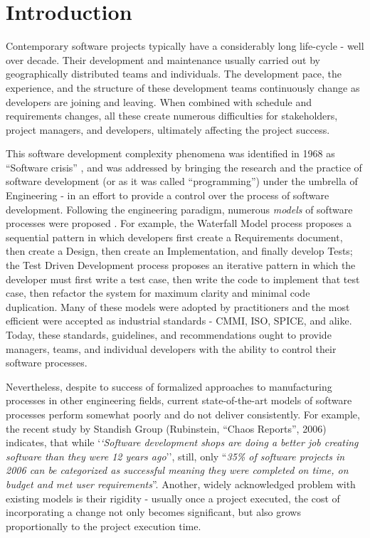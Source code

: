 \chapter{Introduction}
Contemporary software projects typically have a considerably long life-cycle - well over decade.
Their development and maintenance usually carried out by geographically distributed teams 
and individuals. The development pace, the experience, and the structure of these development 
teams continuously change as developers are joining and leaving. When combined with
schedule and requirements changes, all these create numerous difficulties for stakeholders,
project managers, and developers, ultimately affecting the project success. 

This software development complexity phenomena was identified in 1968 as ``Software crisis'' \cite{crisis}, 
and was addressed by bringing the research and the practice of software development 
(or as it was called ``programming'') under the umbrella of Engineering  - in an effort to provide a 
control over the process of software development. 
Following the engineering paradigm, numerous \textit{models} of software processes were proposed \cite{citeulike:10002165}.
For example, the Waterfall Model process proposes a sequential pattern in which developers first create a 
Requirements document, then create a Design, then create an Implementation, and finally develop Tests; 
the Test Driven Development process proposes an iterative pattern in which the developer must first write 
a test case, then write the code to implement that test case, then refactor the system for maximum clarity 
and minimal code duplication. 
Many of these models were adopted by practitioners and the most efficient were accepted as industrial 
standards - CMMI, ISO, SPICE, and alike. Today, these standards, guidelines, and recommendations ought to 
provide managers, teams, and individual developers with the ability to control their software processes.

Nevertheless, despite to success of formalized approaches to manufacturing processes in other 
engineering fields, current state-of-the-art models of software processes perform somewhat poorly 
and do not deliver consistently. 
For example, the recent study by Standish Group (Rubinstein, ``Chaos Reports'', 2006) indicates,
that while `\textit{`Software development shops are doing a better job creating software than they were 
12 years ago}'', still, only ``\textit{35\% of software projects in 2006 can be categorized 
as successful meaning they were completed on time, on budget and met user requirements}”.
Another, widely acknowledged problem with existing models is their rigidity - usually 
once a project executed, the cost of incorporating a change not only becomes significant, but also 
grows proportionally to the project execution time.

